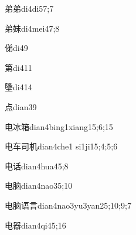 \begin{verbete}{弟弟}{di4di5}{7;7}
\end{verbete}

\begin{verbete}{弟妹}{di4mei4}{7;8}
\end{verbete}

\begin{verbete}{俤}{di4}{9}
\end{verbete}

\begin{verbete}{第}{di4}{11}
\end{verbete}

\begin{verbete}{墬}{di4}{14}
\end{verbete}

\begin{verbete}{点}{dian3}{9}
\end{verbete}

\begin{verbete}{电冰箱}{dian4bing1xiang1}{5;6;15}
\end{verbete}

\begin{verbete}{电车司机}{dian4che1 si1ji1}{5;4;5;6}
\end{verbete}

\begin{verbete}{电话}{dian4hua4}{5;8}
\end{verbete}

\begin{verbete}{电脑}{dian4nao3}{5;10}
\end{verbete}

\begin{verbete}{电脑语言}{dian4nao3yu3yan2}{5;10;9;7}
\end{verbete}

\begin{verbete}{电器}{dian4qi4}{5;16}
\end{verbete}

